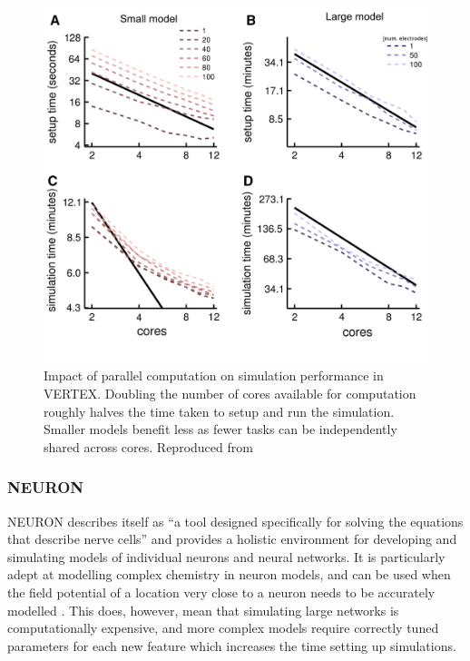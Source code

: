 \begin{figure}[h!]
    \centering
    \includegraphics[scale=1.2]{figures/graphs/coresVERTEX.png}
    \caption[Impact of parallel computation on
        simulation performance in VERTEX] {Impact of parallel computation on
        simulation performance in VERTEX. Doubling the number of cores available
        for computation roughly halves the time taken to setup and run the
        simulation. Smaller models benefit less as fewer tasks can be
        independently shared across cores. \small{Reproduced from \cite{tomsett_virtual_2015}}}
    \label{VERTEXparallel}
\end{figure}
\vspace{1ex}

\FloatBarrier

\subsubsection{NEURON}

NEURON describes itself as ``a tool designed specifically for solving the
equations that describe nerve cells'' and provides a holistic environment for
developing and simulating models of individual neurons and neural networks. It
is particularly adept at modelling complex chemistry in neuron models, and can
be used when the field potential of a location very close to a neuron needs to
be accurately modelled \autocite{carnevale_neuron_2006}. This does, however,
mean that simulating large networks is computationally expensive, and more
complex models require correctly tuned parameters for each new feature which
increases the time setting up simulations.

